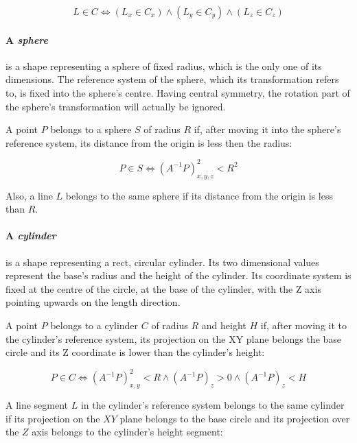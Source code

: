 \begin{equation}
  L \in C \Leftrightarrow \left(L_x \in C_x\right) \wedge
  \left(L_y \in C_y\right) \wedge \left(L_z
    \in C_z\right)
\end{equation}

\paragraph{A \emph{sphere}} is a shape representing a sphere of fixed radius,
which is the only one of its dimensions. The reference system of the sphere, 
which its transformation refers to, is fixed into the sphere's centre. Having
central symmetry, the rotation part of the sphere's transformation will actually
be ignored.

A point $P$ belongs to a sphere $S$ of radius $R$ if, after moving it into the
sphere's reference system, its distance from the origin is less then the radius:

\begin{equation}
  P \in S \Leftrightarrow \left(A^{-1}P\right)_{x,y,z}^2 < R^2
\end{equation}

Also, a line $L$ belongs to the same sphere if its distance from the origin is less
than $R$.

\paragraph{A \emph{cylinder}} is a shape representing a rect, circular cylinder.
Its two dimensional values represent the base's radius and the height of the
cylinder. Its coordinate system is fixed at the centre of the circle, at the
base of the cylinder, with the
Z axis pointing upwards on the length direction.

A point $P$ belongs to a cylinder $C$ of radius $R$ and height $H$ if, after
moving it to the cylinder's reference system, its projection on the XY plane
belongs the base circle and its Z coordinate is lower than the cylinder's
height:

\begin{equation}
  P \in C \Leftrightarrow \left(A^{-1}P\right)_{x,y}^2 < R \wedge
  \left(A^{-1}P\right)_z > 0 \wedge \left(A^{-1}P\right)_z<H
\end{equation}

A line segment $L$ in the cylinder's reference system belongs to the same cylinder if its projection on the $XY$
plane belongs to the base circle and its projection over the $Z$ axis belongs to
the cylinder's height segment:

